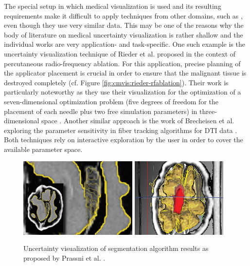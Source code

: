 The special setup in which medical visualization is used and its resulting requirements make it difficult to apply techniques from other domains, such as \cite{Pfaffelmoser:2011:VisualizingVariability, Pothkow:2011:PositionalUncertainty}, even though they use very similar data.
This may be one of the reasons why the body of literature on medical uncertainty visualization is rather shallow and the individual works are very application- and task-specific.
One such example is the uncertainty visualization technique of Rieder et al. proposed in the context of percutaneous radio-frequency ablation.
For this application, precise planning of the applicator placement is crucial in order to ensure that the malignant tissue is destroyed completely (cf. Figure \ref{fig:cmvis:rieder-rfablation}).
Their work is particularly noteworthy as they use their visualization for the optimization of a seven-dimensional optimization problem (five degrees of freedom for the placement of each needle plus two free simulation parameters) in three-dimensional space \cite{Rieder:2011:AblationApproximation}.
Another similar approach is the work of Brecheisen et al. exploring the parameter sensitivity in fiber tracking algorithms for DTI data \cite{Brecheisen:2009:ParameterSensitivy}.
Both techniques rely on interactive exploration by the user in order to cover the available parameter space.

\begin{figure}[ht]
	\centering
	\includegraphics[height=4cm]{figures/cmvis/prassni-uncertainty1.jpg}
	\qquad
	\includegraphics[height=4cm]{figures/cmvis/prassni-uncertainty2.jpg}
	\caption{
		Uncertainty visualization of segmentation algorithm results as proposed by Prassni et al. \cite{Prassni:2010:Uncertainty}.
	}
	\label{fig:cmvis:prassni-uncertainty}
\end{figure}

